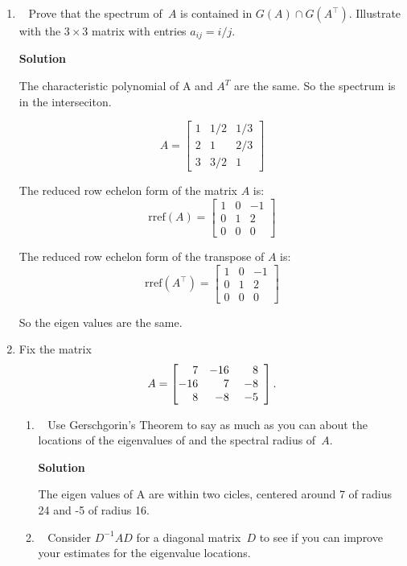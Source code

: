 \documentclass[11pt]{article}
\newcommand\score[1]{\marginpar{\vspace{-2ex}\color{blue}{#1/3}}\hspace{-1ex}}
\newcommand\0{\mathbf{0}}
\newcommand\<{\langle}
\renewcommand\>{\rangle}
\begin{document}
\begin{enumerate}
\item\ \score{}%
Prove that the spectrum of~$A$ is contained in $G(A) \cap G(A^\top)$.
Illustrate with the $3 \times 3$ matrix with entries $a_{ij} = i/j$.

\textbf{Solution}

The characteristic polynomial of A and $A^{T}$ are the same. So the spectrum
is in the interseciton.

$$
A=\begin{bmatrix}
  1 & 1/2 & 1/3\\
  2 & 1 & 2/3\\
  3 & 3/2 & 1
\end{bmatrix}
$$

The reduced row echelon form of the matrix \( A \) is:
\[
\text{rref}(A) =
\begin{bmatrix}
1 & 0 & -1 \\
0 & 1 & 2 \\
0 & 0 & 0
\end{bmatrix}
\]

The reduced row echelon form of the transpose of \( A \) is:
\[
\text{rref}(A^\top) =
\begin{bmatrix}
1 & 0 & -1 \\
0 & 1 & 2 \\
0 & 0 & 0
\end{bmatrix}
\]

So the eigen values are the same.

\item%
Fix the matrix
  $$%
  A =
  \left[
  \begin{array}{@{}rrr}
     7 & -16\ &  8 \\
   -16 &  7 \ & -8 \\
     8 & -8 \ & -5 
  \end{array}
  \right].
  $$%
\begin{enumerate}%
  \item\ \score{}%
  Use Gerschgorin's Theorem to say as much as you can about the
  locations of the eigenvalues of and the spectral radius of~$A$.

  \textbf{Solution}

  The eigen values of A are within two cicles, centered around 7 of radius 24 and -5 of radius 16.
  
  \item\ \score{}%
  Consider $D^{-1}AD$ for a diagonal matrix~$D$ to see if you can
  improve your estimates for the eigenvalue locations.


\end{enumerate}
\end{enumerate}
\end{document}
